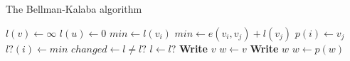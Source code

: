 











\begin{algorithm}
\caption{The Bellman-Kalaba algorithm}
\begin{algorithmic}[1]
\State $l(v) \leftarrow \infty$
\EndFor
\State $l(u) \leftarrow 0$
\Repeat
{}
\State $min \leftarrow l(v_i)$
\State $min \leftarrow e(v_i, v_j) + l(v_j)$
\State $p(i) \leftarrow v_j$
\EndIf
\EndFor
\State $l?(i) \leftarrow min$
\EndFor
\State $changed \leftarrow l \not= l?$
\State $l \leftarrow l?$
\EndProcedure
\Statex
{}
\State \textbf{Write} $v$
\Else
\State $w \leftarrow v$
\State \textbf{Write} $w$
\State $w \leftarrow p(w)$
\EndWhile
\EndIf
\EndProcedure
\end{algorithmic}
\end{algorithm}





